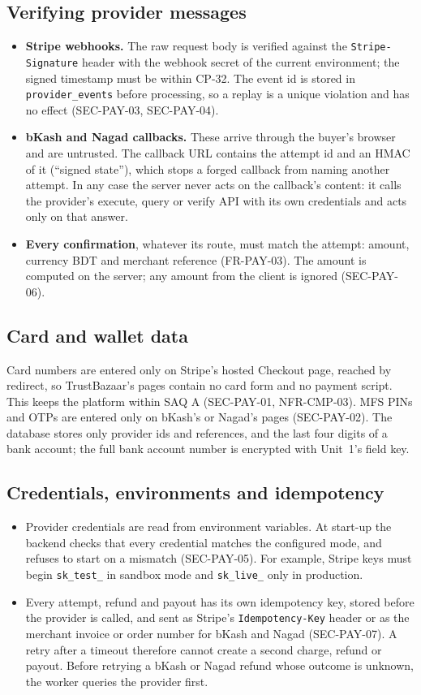 \documentclass[11pt,a4paper]{article}
\begin{document}
\subsection{Verifying provider messages}
\label{sec:verify}
\begin{itemize}[nosep]
  \item \textbf{Stripe webhooks.} The raw request body is verified against the \texttt{Stripe-Signature} header with the webhook secret of the current environment; the signed timestamp must be within CP-32. The event id is stored in \texttt{provider\_events} before processing, so a replay is a unique violation and has no effect (SEC-PAY-03, SEC-PAY-04).
  \item \textbf{bKash and Nagad callbacks.} These arrive through the buyer's browser and are untrusted. The callback URL contains the attempt id and an HMAC of it (``signed state''), which stops a forged callback from naming another attempt. In any case the server never acts on the callback's content: it calls the provider's execute, query or verify API with its own credentials and acts only on that answer.
  \item \textbf{Every confirmation}, whatever its route, must match the attempt: amount, currency BDT and merchant reference (FR-PAY-03). The amount is computed on the server; any amount from the client is ignored (SEC-PAY-06).
\end{itemize}

\subsection{Card and wallet data}
Card numbers are entered only on Stripe's hosted Checkout page, reached by redirect, so TrustBazaar's pages contain no card form and no payment script. This keeps the platform within SAQ A (SEC-PAY-01, NFR-CMP-03). MFS PINs and OTPs are entered only on bKash's or Nagad's pages (SEC-PAY-02). The database stores only provider ids and references, and the last four digits of a bank account; the full bank account number is encrypted with Unit~1's field key.

\subsection{Credentials, environments and idempotency}
\begin{itemize}[nosep]
  \item Provider credentials are read from environment variables. At start-up the backend checks that every credential matches the configured mode, and refuses to start on a mismatch (SEC-PAY-05). For example, Stripe keys must begin \texttt{sk\_test\_} in sandbox mode and \texttt{sk\_live\_} only in production.
  \item Every attempt, refund and payout has its own idempotency key, stored before the provider is called, and sent as Stripe's \texttt{Idempotency-Key} header or as the merchant invoice or order number for bKash and Nagad (SEC-PAY-07). A retry after a timeout therefore cannot create a second charge, refund or payout. Before retrying a bKash or Nagad refund whose outcome is unknown, the worker queries the provider first.
\end{itemize}
\end{document}
